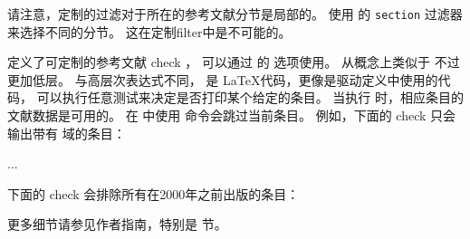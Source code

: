 \begin{ltxexample}[style=ifthen,morekeywords={\\type,\\keyword}]{}
\end{ltxexample}
%
请注意，定制的过滤对于所在的参考文献分节是局部的。
使用  的 \texttt{section} 过滤器来选择不同的分节。
这在定制filter中是不可能的。

\begin{ltxsyntax}



定义了可定制的参考文献 check ，
可以通过  的  选项使用。
 从概念上类似于  不过更加低层。
与高层次表达式不同， 是 \LaTeX 代码，更像是驱动定义中使用的代码，
可以执行任意测试来决定是否打印某个给定的条目。
当执行  时，相应条目的文献数据是可用的。
在  中使用  命令会跳过当前条目。
例如，下面的 check 只会输出带有  域的条目：

\begin{ltxexample}
...
\printbibliography[<<check=abstract>>]
\end{ltxexample}
%
下面的 check 会排除所有在2000年之前出版的条目：

\begin{ltxexample}
\end{ltxexample}
%
更多细节请参见作者指南，特别是  节。

\end{ltxsyntax}

